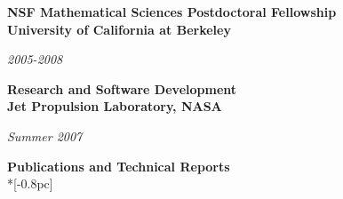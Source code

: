 \documentclass[11pt]{article}
\newcommand{\head}[1]{
  \vspace{10pt}
  {\Large \bf #1} \\*[-0.8pc]
  \underline{\hspace{6.07in}}}
\newcommand{\datedentry}[2]{
  \vspace{5pt}
  \begin{minipage}{5in}{\textbf{#1}}\end{minipage}
  \hfill
  \begin{minipage}{1in}{\hfill\textit{#2}}\end{minipage}
  }
\begin{document}
\datedentry{NSF Mathematical Sciences Postdoctoral Fellowship\\
University of California at Berkeley}{2005-2008}

\vspace{7pt}

\datedentry{Research and Software Development \\
Jet Propulsion Laboratory, NASA}{Summer 2007}
%
%
%
%
%
%
%
%
%
%
%
%
%
%
%

\head{Publications and Technical Reports}%

 \vspace{.1mm}
\end{document}
